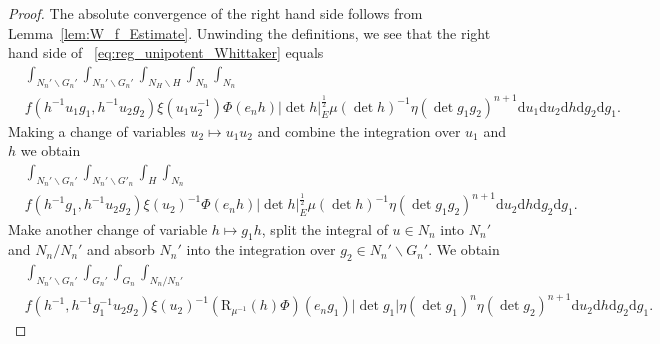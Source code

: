 \documentclass[letterpaper,11pt]{amsart}
\newcommand{\rd}{\mathrm{d}}
\newcommand{\bs}{\backslash}
\newcommand{\<}{\negthickspace}
\providecommand{\abs}[1]{\lvert#1\rvert}
\theoremstyle{definition}
\theoremstyle{plain}
\theoremstyle{remark}
\numberwithin{equation}{section}
\begin{document}
\begin{proof}
The absolute convergence of the right hand side follows from Lemma~\ref{lem:W_f_Estimate}. Unwinding the
definitions, we see that the right hand side of
~\eqref{eq:reg_unipotent_Whittaker} equals
    \[
    \begin{aligned}
    &\int_{N_n' \bs G_n'} \int_{N_n' \bs G_n'}
    \int_{N_H \bs H}  \int_{N_n} \int_{N_n}\\
    &f(h^{-1} u_1 g_1, h^{-1} u_2 g_2)
    \xi(u_1u_2^{-1}) \Phi(e_n h)
    \abs{\det h}_E^{\frac{1}{2}} \mu(\det h)^{-1}
    \eta(\det g_1 g_2)^{n+1} \rd u_1  \rd u_2  \rd h \rd g_2 \rd g_1 .
    \end{aligned}
    \]
Making a change of variables $u_2 \mapsto u_1u_2$ and combine the integration
over $u_1$ and $h$ we obtain
    \[
    \begin{aligned}
    &\int_{N_n' \bs G_n'} \int_{N_n' \bs G'_n}
    \int_{H}  \int_{N_n} \\
    &f(h^{-1} g_1, h^{-1} u_2 g_2)
    \xi(u_2)^{-1} \Phi(e_n h)
    \abs{\det h}_E^{\frac{1}{2}} \mu(\det h)^{-1}
    \eta(\det g_1 g_2)^{n+1} \rd u_2 \rd h \rd g_2 \rd g_1.
    \end{aligned}
    \]
Make another change of variable $h \mapsto g_1 h$, split the integral of $u
\in N_n$ into $N_n'$ and $N_n/N_n'$ and absorb $N_n'$ into the integration
over $g_2 \in N_n' \bs G_n'$. We obtain
    \[
    \begin{aligned}
    &\int_{N_n' \bs G_n'} \int_{G_n'}
    \int_{G_n}  \int_{N_n/N_n'} \\
    &f(h^{-1}, h^{-1} g_1^{-1} u_2 g_2)
    \xi(u_2)^{-1} (\mathrm{R}_{\mu^{-1}}(h)\Phi)(e_n g_1)
    \abs{\det g_1}
    \eta(\det g_1)^{n} \eta(\det g_2)^{n+1} \rd u_2 \rd h \rd g_2 \rd g_1.
    \end{aligned}
    \]


\end{proof}
\end{document}
